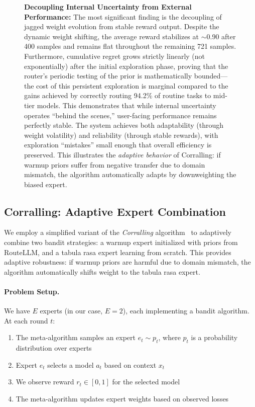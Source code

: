 \begin{figure}[t]
{%
\textbf{Decoupling Internal Uncertainty from External Performance:} The most significant finding is the decoupling of jagged weight evolution from stable reward output. Despite the dynamic weight shifting, the average reward stabilizes at $\sim$0.90 after 400 samples and remains flat throughout the remaining 721 samples. Furthermore, cumulative regret grows strictly linearly (not exponentially) after the initial exploration phase, proving that the router's periodic testing of the prior is mathematically bounded---the cost of this persistent exploration is marginal compared to the gains achieved by correctly routing 94.2\% of routine tasks to mid-tier models. This demonstrates that while internal uncertainty operates ``behind the scenes,'' user-facing performance remains perfectly stable. The system achieves both adaptability (through weight volatility) and reliability (through stable rewards), with exploration ``mistakes'' small enough that overall efficiency is preserved.
%
This illustrates the \emph{adaptive behavior} of Corralling: if warmup priors suffer from negative transfer due to domain mismatch, the algorithm automatically adapts by downweighting the biased expert.
}
\label{fig:corralling_semantic}
\end{figure}



\subsection{Corralling: Adaptive Expert Combination}
\label{sec:corralling}

We employ a simplified variant of the \emph{Corralling} algorithm~\cite{agarwal2017corralling} to adaptively combine two bandit strategies:
a warmup expert initialized with priors from RouteLLM, and a tabula rasa expert learning from scratch.
This provides adaptive robustness: if warmup priors are harmful due to domain mismatch, the algorithm automatically shifts weight to the tabula rasa expert.

\paragraph{Problem Setup.}
We have $E$ experts (in our case, $E=2$), each implementing a bandit algorithm.
At each round $t$:
\begin{enumerate}[nosep]
    \item The meta-algorithm samples an expert $e_t \sim p_t$, where $p_t$ is a probability distribution over experts
    \item Expert $e_t$ selects a model $a_t$ based on context $x_t$
    \item We observe reward $r_t \in [0,1]$ for the selected model
    \item The meta-algorithm updates expert weights based on observed losses
\end{enumerate}

